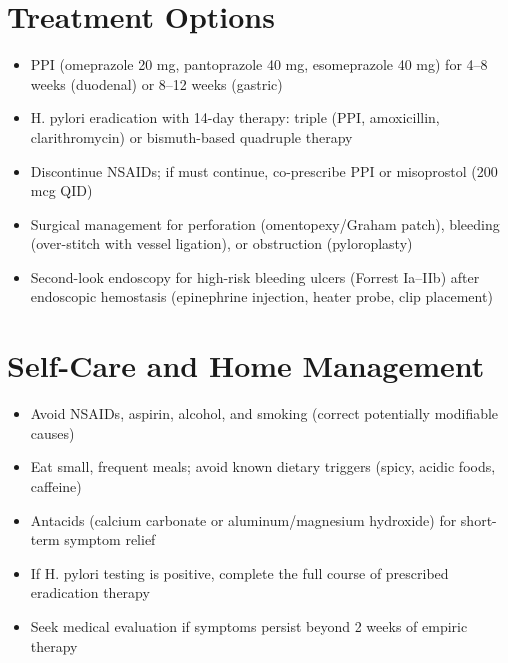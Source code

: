 \section*{Treatment Options}
\begin{itemize}
  \item PPI (omeprazole 20 mg, pantoprazole 40 mg, esomeprazole 40 mg) for 4--8 weeks (duodenal) or 8--12 weeks (gastric)
  \item H. pylori eradication with 14-day therapy: triple (PPI, amoxicillin, clarithromycin) or bismuth-based quadruple therapy
  \item Discontinue NSAIDs; if must continue, co-prescribe PPI or misoprostol (200 mcg QID)
  \item Surgical management for perforation (omentopexy/Graham patch), bleeding (over-stitch with vessel ligation), or obstruction (pyloroplasty)
  \item Second-look endoscopy for high-risk bleeding ulcers (Forrest Ia--IIb) after endoscopic hemostasis (epinephrine injection, heater probe, clip placement)
\end{itemize}

\section*{Self-Care and Home Management}
\begin{itemize}
  \item Avoid NSAIDs, aspirin, alcohol, and smoking (correct potentially modifiable causes)
  \item Eat small, frequent meals; avoid known dietary triggers (spicy, acidic foods, caffeine)
  \item Antacids (calcium carbonate or aluminum/magnesium hydroxide) for short-term symptom relief
  \item If H. pylori testing is positive, complete the full course of prescribed eradication therapy
  \item Seek medical evaluation if symptoms persist beyond 2 weeks of empiric therapy
\end{itemize}

